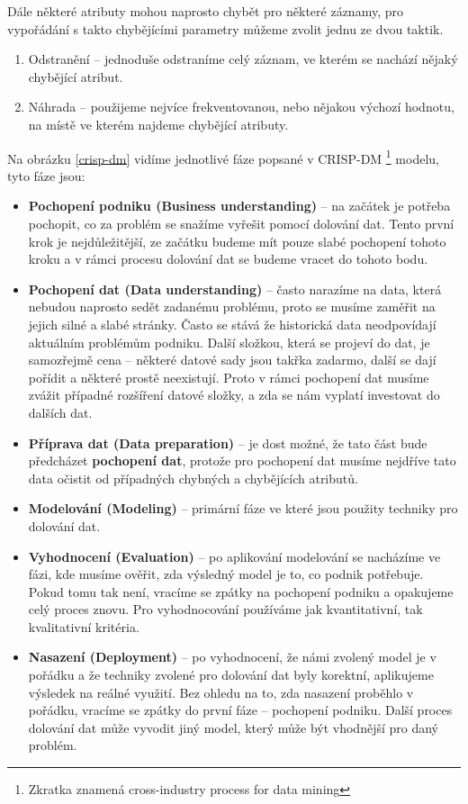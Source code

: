\par Dále některé atributy mohou naprosto chybět pro některé záznamy, pro vypořádání s takto chybějícími parametry můžeme zvolit jednu ze dvou taktik. \cite{data-mining-principles}
\begin{enumerate}
\item Odstranění -- jednoduše odstraníme celý záznam, ve kterém se nachází nějaký chybějící atribut.
\item Náhrada -- použijeme nejvíce frekventovanou, nebo nějakou výchozí hodnotu, na místě ve kterém najdeme chybějící atributy. \cite{data-mining-principles}
\end{enumerate}

\par Na obrázku \ref{crisp-dm} vidíme jednotlivé fáze popsané v CRISP-DM \footnote{Zkratka znamená cross-industry process for data mining} modelu, tyto fáze jsou:
\begin{itemize}
\item \textbf{Pochopení podniku (Business understanding)} -- na začátek je potřeba pochopit, co za problém se snažíme vyřešit pomocí dolování dat. Tento první krok je nejdůležitější, ze začátku budeme mít pouze slabé pochopení tohoto kroku a v rámci procesu dolování dat se budeme vracet do tohoto bodu. \cite{data-mining-practical}
\item \textbf{Pochopení dat (Data understanding)} -- často narazíme na data, která nebudou naprosto sedět zadanému problému, proto se musíme zaměřit na jejich silné a slabé stránky. Často se stává že historická data neodpovídají aktuálním problémům podniku. Další složkou, která se projeví do dat, je samozřejmě cena -- některé datové sady jsou takřka zadarmo, další se dají pořídit a některé prostě neexistují. Proto v rámci pochopení dat musíme zvážit případné rozšíření datové složky, a zda se nám vyplatí investovat do dalších dat. \cite{data-mining-practical}
\item \textbf{Příprava dat (Data preparation)} -- je dost možné, že tato část bude předcházet \textbf{pochopení dat}, protože pro pochopení dat musíme nejdříve tato data očistit od případných chybných a chybějících atributů. \cite{data-mining-practical}
\item \textbf{Modelování (Modeling)} -- primární fáze ve které jsou použity techniky pro dolování dat. \cite{data-mining-practical}
\item \textbf{Vyhodnocení (Evaluation)} -- po aplikování modelování se nacházíme ve fázi, kde musíme ověřit, zda výsledný model je to, co podnik potřebuje. Pokud tomu tak není, vracíme se zpátky na pochopení podniku a opakujeme celý proces znovu. Pro vyhodnocování používáme jak kvantitativní, tak kvalitativní kritéria. \cite{data-mining-practical}
\item \textbf{Nasazení (Deployment)} -- po vyhodnocení, že námi zvolený model je v pořádku a že techniky zvolené pro dolování dat byly korektní, aplikujeme výsledek na reálné využití. Bez ohledu na to, zda nasazení proběhlo v pořádku, vracíme se zpátky do první fáze -- pochopení podniku. Další proces dolování dat může vyvodit jiný model, který může být vhodnější pro daný problém. \cite{data-mining-practical}
\end{itemize}

